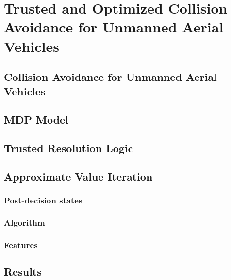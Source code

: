 \chapter{Trusted and Optimized Collision Avoidance for Unmanned Aerial Vehicles}

\section{Collision Avoidance for Unmanned Aerial Vehicles}

\section{MDP Model}

\section{Trusted Resolution Logic}

\section{Approximate Value Iteration}

\subsection{Post-decision states}
\subsection{Algorithm}
\subsection{Features}

\section{Results}
